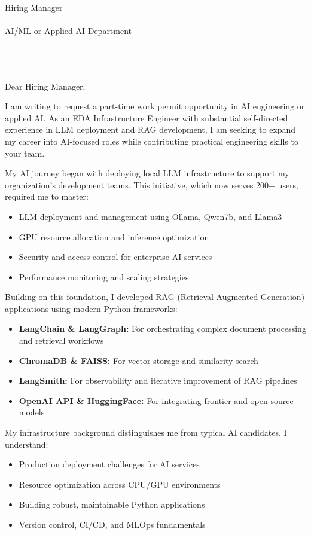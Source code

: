 \documentclass[11pt,a4paper]{letter}
\date{\today}
\begin{document}
\begin{letter}{
    Hiring Manager\\\\
    AI/ML or Applied AI Department\\\\
    [Company Name]\\\\
    [Company Address]
}

\opening{Dear Hiring Manager,}

I am writing to request a part-time work permit opportunity in AI engineering or applied AI. As an EDA Infrastructure Engineer with substantial self-directed experience in LLM deployment and RAG development, I am seeking to expand my career into AI-focused roles while contributing practical engineering skills to your team.

My AI journey began with deploying local LLM infrastructure to support my organization's development teams. This initiative, which now serves 200+ users, required me to master:
\begin{itemize}
    \item LLM deployment and management using Ollama, Qwen7b, and Llama3
    \item GPU resource allocation and inference optimization
    \item Security and access control for enterprise AI services
    \item Performance monitoring and scaling strategies
\end{itemize}

Building on this foundation, I developed RAG (Retrieval-Augmented Generation) applications using modern Python frameworks:
\begin{itemize}
    \item \textbf{LangChain \& LangGraph:} For orchestrating complex document processing and retrieval workflows
    \item \textbf{ChromaDB \& FAISS:} For vector storage and similarity search
    \item \textbf{LangSmith:} For observability and iterative improvement of RAG pipelines
    \item \textbf{OpenAI API \& HuggingFace:} For integrating frontier and open-source models
\end{itemize}

My infrastructure background distinguishes me from typical AI candidates. I understand:
\begin{itemize}
    \item Production deployment challenges for AI services
    \item Resource optimization across CPU/GPU environments
    \item Building robust, maintainable Python applications
    \item Version control, CI/CD, and MLOps fundamentals
\end{itemize}


\end{letter}
\end{document}
